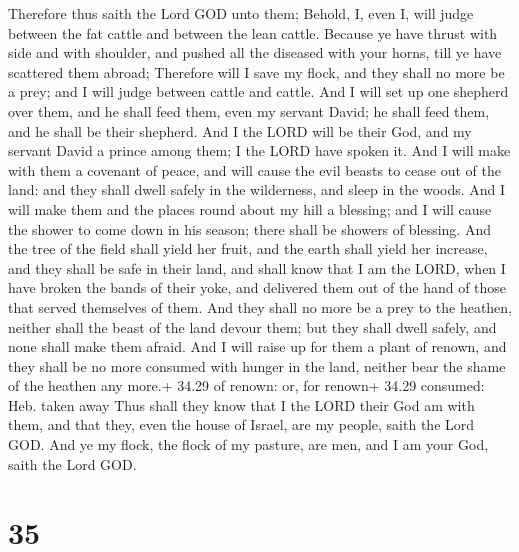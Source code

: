  Therefore thus saith the Lord GOD unto them; Behold, I,
even I, will judge between the fat cattle and between the lean cattle.
 Because ye have thrust with side and with shoulder, and
pushed all the diseased with your horns, till ye have scattered them
abroad;  Therefore will I save my flock, and they shall no
more be a prey; and I will judge between cattle and cattle.
 And I will set up one shepherd over them, and he shall
feed them, even my servant David; he shall feed them, and he shall be
their shepherd.  And I the LORD will be their God, and my
servant David a prince among them; I the LORD have spoken it.
 And I will make with them a covenant of peace, and will
cause the evil beasts to cease out of the land: and they shall dwell
safely in the wilderness, and sleep in the woods.  And I
will make them and the places round about my hill a blessing; and I will
cause the shower to come down in his season; there shall be showers of
blessing.  And the tree of the field shall yield her fruit,
and the earth shall yield her increase, and they shall be safe in their
land, and shall know that I am the LORD, when I have broken the bands of
their yoke, and delivered them out of the hand of those that served
themselves of them.  And they shall no more be a prey to
the heathen, neither shall the beast of the land devour them; but they
shall dwell safely, and none shall make them afraid.  And I
will raise up for them a plant of renown, and they shall be no more
consumed with hunger in the land, neither bear the shame of the heathen
any more.+ 34.29 of renown: or, for renown+ 34.29 consumed: Heb. taken
away  Thus shall they know that I the LORD their God am
with them, and that they, even the house of Israel, are my people, saith
the Lord GOD.  And ye my flock, the flock of my pasture,
are men, and I am your God, saith the Lord GOD.

\hypertarget{section-34}{%
\section{35}\label{section-34}}

